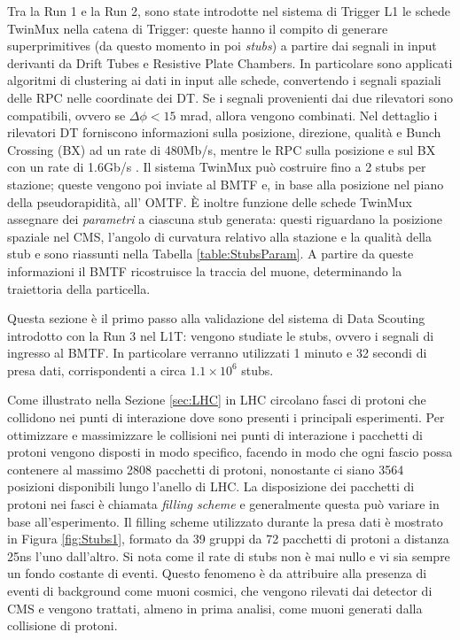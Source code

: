 Tra la Run 1 e la Run 2, sono state introdotte nel sistema di Trigger L1 le schede TwinMux nella catena di Trigger: queste hanno il compito di generare superprimitives (da questo momento in poi \textit{stubs}) a partire dai segnali in input derivanti da Drift Tubes e Resistive Plate Chambers. \newline
In particolare sono applicati algoritmi di clustering ai dati in input alle schede, convertendo i segnali spaziali delle RPC nelle coordinate dei DT. Se i segnali provenienti dai due rilevatori sono compatibili, ovvero se $\Delta \phi < 15$ \si{mrad}, allora vengono combinati. Nel dettaglio i rilevatori DT forniscono informazioni sulla posizione, direzione, qualità e Bunch Crossing (BX) ad un rate di 480Mb/s, mentre le RPC sulla posizione e sul BX con un rate di 1.6Gb/s \cite{CERNsummerSchool}.\newline
Il sistema TwinMux può costruire fino a 2 stubs per stazione; queste vengono poi inviate al BMTF e, in base alla posizione nel piano della pseudorapidità, all' OMTF. \newline
È inoltre funzione delle schede TwinMux assegnare dei \textit{parametri} a ciascuna stub generata: questi riguardano la posizione spaziale nel CMS, l'angolo di curvatura relativo alla stazione e la qualità della stub e sono riassunti nella Tabella \ref{table:StubsParam}. A partire da queste informazioni il BMTF ricostruisce la traccia del muone, determinando la traiettoria della particella. 

Questa sezione è il primo passo alla validazione del sistema di Data Scouting introdotto con la Run 3 nel L1T: vengono studiate le stubs, ovvero i segnali di ingresso al BMTF. In particolare verranno utilizzati 1 minuto e 32 secondi di presa dati, corrispondenti a circa $1.1 \times 10^{6}$ stubs. 

Come illustrato nella Sezione \ref{sec:LHC} in LHC circolano fasci di protoni che collidono nei punti di interazione dove sono presenti i principali esperimenti. Per ottimizzare e massimizzare le collisioni nei punti di interazione i pacchetti di protoni vengono disposti in modo specifico, facendo in modo che ogni fascio possa contenere al massimo 2808 pacchetti di protoni, nonostante ci siano 3564 posizioni disponibili lungo l'anello di LHC. La disposizione dei pacchetti di protoni nei fasci è chiamata \textit{filling scheme} e generalmente questa può variare in base all'esperimento. Il filling scheme utilizzato durante la presa dati è mostrato in Figura \ref{fig:Stubs1}, formato da 39 gruppi da 72 pacchetti di protoni a distanza 25ns l'uno dall'altro\cite{Bailey}. \newline
Si nota come il rate di stubs non è mai nullo e vi sia sempre un fondo costante di eventi. Questo fenomeno è da attribuire alla presenza di eventi di background come muoni cosmici, che vengono rilevati dai detector di CMS e vengono trattati, almeno in prima analisi, come muoni generati dalla collisione di protoni.




